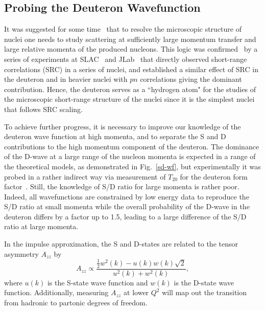 \subsection{Probing the Deuteron Wavefunction}

It was suggested for some time~\cite{Frankfurt:1981mk} that to resolve the microscopic structure of nuclei one needs to study scattering at sufficiently large momentum transfer and large relative momenta of the produced nucleons. This logic was confirmed~\cite{Arrington:2011xs} by a series of experiments at SLAC~\cite{Frankfurt:1993sp} and JLab~\cite{Arrington:1998ps,Fomin:2011ng} that directly observed short-range correlations (SRC) in a series of nuclei, and established a similar effect of SRC in the deuteron and in heavier nuclei with $pn$ correlations giving the dominant contribution.  Hence, the deuteron serves as a ``hydrogen atom" for the studies of the microscopic short-range structure of the nuclei since it is the simplest nuclei that follows SRC scaling.

To achieve further progress, it is necessary to improve our knowledge of the deuteron wave function at high momenta, and to separate the S and D contributions to the high momentum component of the deuteron. The dominance of the D-wave at a large range of the nucleon momenta is expected in a range of the theoretical models, as demonstrated in Fig.~\ref{sd-wf}, but experimentally it was probed in a rather indirect way via measurement of $T_{20}$ for the deuteron form factor~\cite{Garcon:2001sz}. Still, the knowledge of S/D ratio for large momenta is rather poor. Indeed, all wavefunctions are constrained by low energy data to reproduce the S/D ratio at small momenta while the overall probability of the D-wave in the deuteron differs by a factor up to 1.5, leading to a large difference of the S/D ratio at large momenta.

In the impulse approximation, the S and D-states are related to the tensor asymmetry $A_{zz}$ by~\cite{Frankfurt:1988nt}
\begin{equation}
	A_{zz} \propto \frac{\frac{1}{2}w^2(k)-u(k)w(k)\sqrt{2}}{u^2(k)+w^2(k)},
\end{equation}
where $u(k)$ is the S-state wave function and $w(k)$ is the D-state wave function. Additionally, measuring $A_{zz}$ at lower $Q^2$ will map out the transition from hadronic to partonic degrees of freedom.

